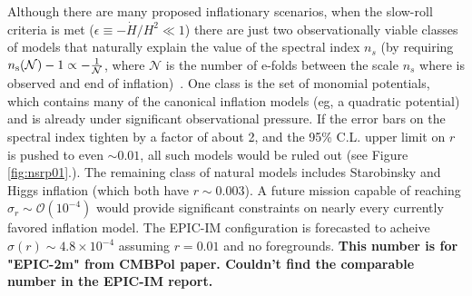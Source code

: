 Although there are many proposed inflationary scenarios, when the slow-roll criteria is met ($\epsilon\equiv-\dot{H}/H^2\ll1$) 
there are just two observationally viable classes of models that naturally explain the value of the spectral index $n_s$ (by 
requiring $n_{\rm s}(\mathcal{N})-1\propto-\frac{1}{\mathcal{N}}$, where $\mathcal{N}$ is the number of e-folds between 
the scale $n_s$ where is observed and end of inflation)~\cite{Mukhanov:2013tua,Roest:2013fha,Creminelli:2014nqa}. 
One class is the set of monomial potentials, which contains many of the canonical inflation models (eg, a quadratic potential) 
and is already under significant observational pressure. If the error bars on the spectral index tighten by a factor of about 2, 
and the 95\% C.L. upper limit on $r$ is pushed to even $\sim0.01$, all such models would be ruled out (see Figure \ref{fig:nsrp01}.). 
The remaining class of natural models includes Starobinsky and Higgs inflation (which both have $r\sim0.003$). A future mission 
capable of reaching $\sigma_r\sim\mathcal{O}(10^{-4})$ would provide significant constraints on nearly every currently favored 
inflation model. The EPIC-IM configuration is forecasted to acheive $\sigma(r)\sim4.8 \times 10^{-4}$ assuming $r=0.01$ 
and no foregrounds. {\bf This number is for "EPIC-2m" from CMBPol paper. Couldn't find the comparable number in the EPIC-IM report.}
